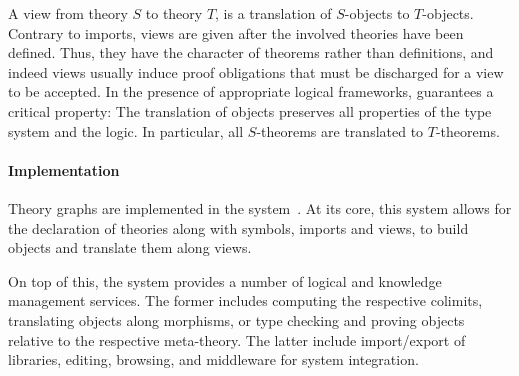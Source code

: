 A view from theory $S$ to theory $T$, is a translation of $S$-objects to $T$-objects.
Contrary to imports, views are given after the involved theories have been defined.
Thus, they have the character of theorems rather than definitions, and indeed views usually induce proof obligations that must be discharged for a view to be accepted.
In the presence of appropriate logical frameworks, \MMT guarantees a critical property: The translation of objects preserves all properties of the type system and the logic.
In particular, all $S$-theorems are translated to $T$-theorems.

\paragraph{Implementation}
Theory graphs are implemented in the \MMT system~\cite{Rabe:MAGMS13,uniformal:on}.
At its core, this system allows for the declaration of theories along with symbols, imports and views, to build objects and translate them along views.

On top of this, the \MMT system provides a number of logical and knowledge management services.
The former includes computing the respective colimits, translating objects along morphisms, or type checking and proving objects relative to the respective meta-theory.
The latter include import/export of libraries, editing, browsing, and middleware for system integration.

